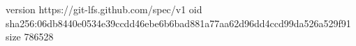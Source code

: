 version https://git-lfs.github.com/spec/v1
oid sha256:06db8440e0534e39ccdd46ebe6b6bad881a77aa62d96dd4ccd99da526a529f91
size 786528
